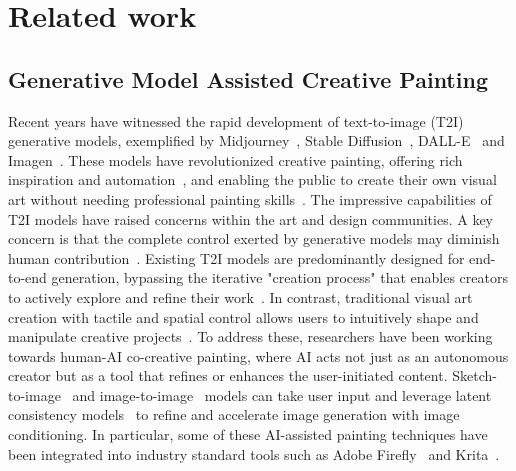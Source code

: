 \section{Related work}\label{sec:related_wotk}

\subsection{Generative Model Assisted Creative Painting}
Recent years have witnessed the rapid development of text-to-image (T2I) generative models, exemplified by Midjourney~\cite{MID}, Stable Diffusion~\cite{rombach2022high}, DALL-E~\cite{ramesh2022hierarchical} and Imagen~\cite{saharia2022photorealistic}.
These models have revolutionized creative painting, offering rich inspiration and automation~\cite{vimpari2023adapt,ko2023large,chiou2023designing}, and enabling the public to create their own visual art without needing professional painting skills~\cite{davis2015enactive, hutson2023generative, shi2023understanding}.
The impressive capabilities of T2I models have raised concerns within the art and design communities.
A key concern is that the complete control exerted by generative models may diminish human contribution~\cite{jiang2023ai,boucher2024resistance}.
Existing T2I models are predominantly designed for end-to-end generation, bypassing the iterative "creation process" that enables creators to actively explore and refine their work~\cite{jiang2023ai,lawton2023tool}.
In contrast, traditional visual art creation with tactile and spatial control allows users to intuitively shape and manipulate creative projects~\cite{ko2023large,aharoni2017pigment, huang2024plantography, li2024realtimegen}.
To address these, researchers have been working towards human-AI co-creative painting, where AI acts not just as an autonomous creator but as a tool that refines or enhances the user-initiated content.
Sketch-to-image~\cite{zhang2023adding,mou2024t2i,koley2023picture} and image-to-image~\cite{rombach2022high, kodaira2023streamdiffusion} models can take user input and leverage latent consistency models~\cite{luo2023lcm,luo2023latent,lee2024streammultidiffusion} to refine and accelerate image generation with image conditioning.
In particular, some of these AI-assisted painting techniques have been integrated into industry standard tools such as Adobe Firefly~\cite{adobe} and Krita~\cite{krita}.

